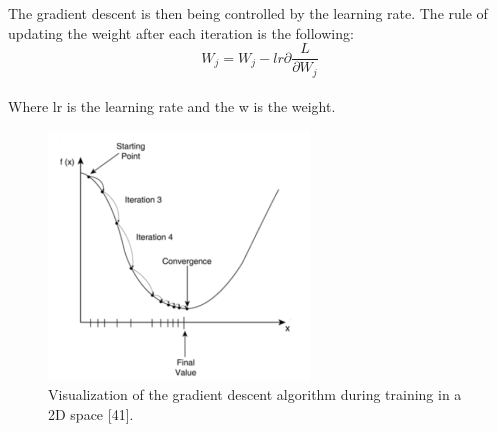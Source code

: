The gradient descent is then being controlled by the learning rate. The rule of updating the weight after each iteration is the following:
\[W_{j} = W_{j} - lr\partial \frac{L}{\partial W_{j}}\]\\

Where lr is the learning rate and the w is the weight.
\begin{figure}[ht]
\centering
\includegraphics{Figures/lr1}
\decoRule
\caption[Visualization of the gradient descent algorithm during training in a 2D space "41"]{Visualization of the gradient descent algorithm during training in a 2D space [41].}
\label{fig:la1}
\end{figure}

